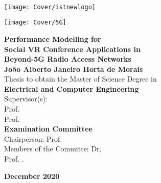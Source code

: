 \setcounter{page}{1} 


\thispagestyle{empty}
\begin{flushleft} ~\\ \vspace{-12mm} \hspace{-12mm}  \texttt{[image: Cover/istnewlogo]} 
\vspace{10mm}
\\ \begin{center} \texttt{[image: Cover/5G]}  \end{center} %
 \vspace{5mm}
\centering
\LARGE \textbf{Performance Modelling for \\Social VR Conference Applications in\\Beyond-5G Radio Access Networks}
\\ \vspace{15mm}
\Large \textbf{Jo{\~a}o Alberto Janeiro Horta de Morais} \\
\vspace{15mm}
\large Thesis to obtain the Master of Science Degree in
\\ \vspace{2mm}
\LARGE \textbf{Electrical and Computer Engineering}
\\ \vspace{10mm}
\large Supervisor(s): \\ Prof. \\ Prof. %
\\ \vspace{10mm}
\Large \textbf{Examination Committee}
\\ \vspace{5mm}
\large Chairperson:	Prof.  \\
\large Members of the Committe: Dr. \\
Prof. .
 

\Large \textbf{December 2020} \\
\let\thepage\relax
\end{flushleft}
\pagebreak


